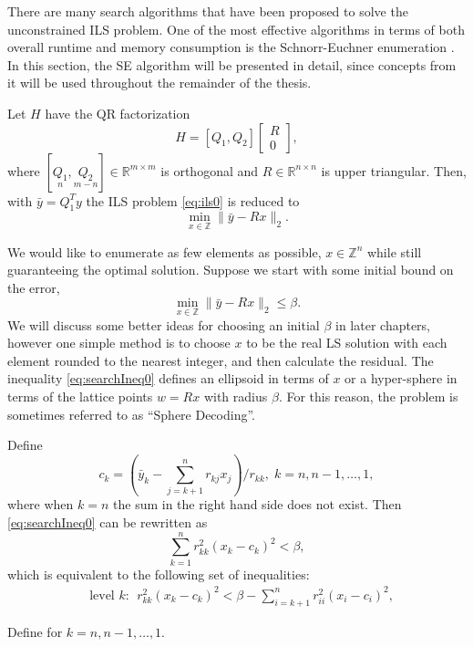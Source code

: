 \documentclass[12pt,Bold,letterpaper]{mcgilletdclass}
\newcommand{\bmx}{\begin{bmatrix}}
\newcommand{\emx}{\end{bmatrix}}
\newcommand{\be}{\begin{equation}}
\newcommand{\ee}{\end{equation}}
\newcommand{\by}{{\bar{y}}}
\begin{document}
There are many search algorithms that have been proposed to solve the unconstrained ILS problem. One of the most effective algorithms in terms of both overall runtime and memory consumption is the Schnorr-Euchner enumeration \cite{SchE94}. In this section, the SE algorithm will be presented in detail, since concepts from it will be used throughout the remainder of the thesis.

Let $H$ have the QR factorization
$$
H=[Q_1, Q_2] \bmx R \\ 0 \emx,
$$
where $[\underset{n}{Q_1}, \underset{m-n}{Q_2}]  \in \mathbb{R}^{m\times m}$ is orthogonal
and $R\in \mathbb{R}^{n\times n}$ is upper triangular. 
Then, with $\bar{y}=Q_1^Ty$ the ILS problem \eqref{eq:ils0} is reduced to 
\be 
\label{eq:ils}
\min_{x \in  {\mathbb{Z}}}  \| \by- Rx \|_2.
\ee

We would like to enumerate as few elements as possible, $ x \in \mathbb{Z}^n$ while still guaranteeing the optimal solution. Suppose we start with some initial bound on the error,
\be 
\label{eq:searchIneq0}
\min_{x \in  {\mathbb{Z}}}  \| \by- Rx \|_2 \le \beta. 
\ee
We will discuss some better ideas for choosing an initial $\beta$ in later chapters, however one simple method is to choose $x$ to be the real LS solution with each element rounded to the nearest integer, and then calculate the residual. The inequality \eqref{eq:searchIneq0} defines an ellipsoid in terms of $x$ or a hyper-sphere in terms of the lattice points $w=Rx$ with radius $\beta$. For this reason, the problem is sometimes referred to as ``Sphere Decoding''.

Define
\begin{equation}
 c_k = (\bar{y}_k - \sum_{j=k+1}^nr_{kj}x_j)/r_{kk}, \; k=n, n-1,\ldots, 1,
\label{eq:searchC}
\end{equation}
where when $k=n$ the sum in the right hand side does not exist.
Then \eqref{eq:searchIneq0} can be rewritten as
$$
\sum_{k=1}^n r_{kk}^2(x_k-c_k)^2 < \beta,
$$
which  is equivalent to the following
set of inequalities:
\begin{align}
&\text{level } k: \ \ r_{kk}^2(x_k-c_k)^2 < \beta -\sum_{i=k+1}^nr_{ii}^2(x_i-c_i)^2, \label{eq:searchLevelK}
\end{align}

Define
for $k=n,n-1,\ldots, 1$.
\end{document}
